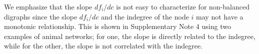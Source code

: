 \documentclass[%
 reprint,
 amsmath,amssymb,
 aip,
]{revtex4-2}
\theoremstyle{italichead}
\theoremstyle{definition}
\begin{document}
{{We emphasize that the slope $d f_i / d c$ is not easy to characterize for non-balanced digraphs since the slope $d f_i / d c$ and the indegree of the node $i$ may not have a monotonic relationship.
This is shown in Supplementary Note 4 using two examples of animal networks; for one, the slope is directly related to the indegree, while for the other, the slope is not correlated with the indegree.}










}
\end{document}
